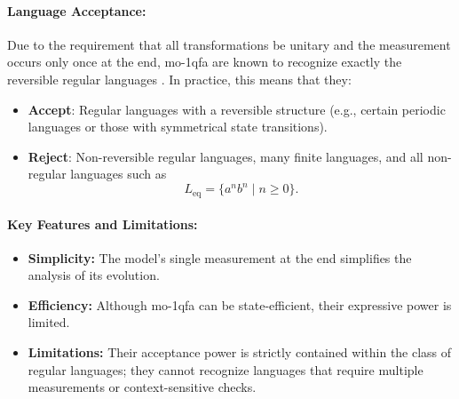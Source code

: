 \paragraph{Language Acceptance:}  
Due to the requirement that all transformations be unitary and the measurement occurs only once at the end, \gls{mo-1qfa} are known to recognize exactly the reversible regular languages \cite{BrodskyPippenger2004,bertoni2001regular}. In practice, this means that they:
\begin{itemize}
    \item \textbf{Accept}: Regular languages with a reversible structure (e.g., certain periodic languages or those with symmetrical state transitions).
    \item \textbf{Reject}: Non-reversible regular languages, many finite languages, and all non-regular languages such as 
    \[
    L_{\text{eq}} = \{a^n b^n \mid n \geq 0\}.
    \]
\end{itemize}

\paragraph{Key Features and Limitations:}
\begin{itemize}
    \item \textbf{Simplicity:} The model’s single measurement at the end simplifies the analysis of its evolution.
    \item \textbf{Efficiency:} Although \gls{mo-1qfa} can be state-efficient, their expressive power is limited.
    \item \textbf{Limitations:} Their acceptance power is strictly contained within the class of regular languages; they cannot recognize languages that require multiple measurements or context-sensitive checks.
\end{itemize}

